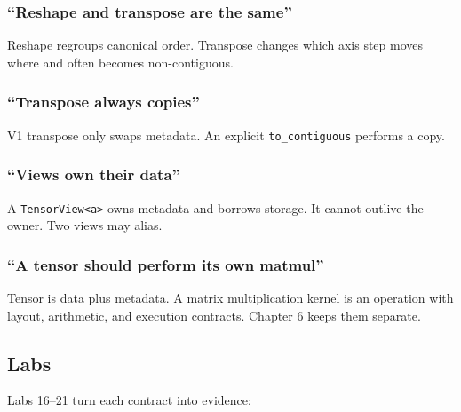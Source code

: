 \documentclass[
  10pt,
]{article}
\begin{document}
\subsubsection{``Reshape and transpose are the
same''}\label{reshape-and-transpose-are-the-same}

Reshape regroups canonical order. Transpose changes which axis step
moves where and often becomes non-contiguous.

\subsubsection{``Transpose always
copies''}\label{transpose-always-copies}

V1 transpose only swaps metadata. An explicit \texttt{to\_contiguous}
performs a copy.

\subsubsection{``Views own their data''}\label{views-own-their-data}

A \texttt{TensorView\textless{}\textquotesingle{}a\textgreater{}} owns
metadata and borrows storage. It cannot outlive the owner. Two views may
alias.

\subsubsection{``A tensor should perform its own
matmul''}\label{a-tensor-should-perform-its-own-matmul}

Tensor is data plus metadata. A matrix multiplication kernel is an
operation with layout, arithmetic, and execution contracts. Chapter 6
keeps them separate.

\subsection{Labs}\label{labs-1}

Labs 16--21 turn each contract into evidence:
\end{document}
